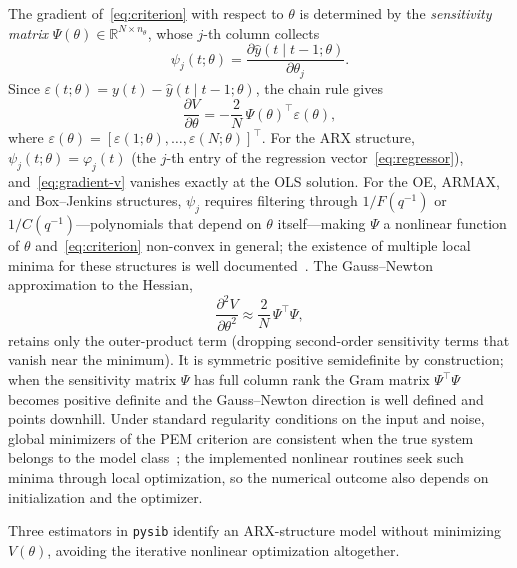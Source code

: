 \documentclass{ifacconf}
\begin{document}
The gradient of~\eqref{eq:criterion} with respect to $\theta$ is
determined by the \emph{sensitivity matrix}
$\Psi(\theta) \in \mathbb{R}^{N \times n_\theta}$, whose $j$-th column collects
\begin{equation}
  \psi_j(t;\theta) = \frac{\partial\hat{y}(t \mid t-1;\theta)}{\partial\theta_j}.
  \label{eq:sensitivity}
\end{equation}
Since $\varepsilon(t;\theta) = y(t) - \hat{y}(t \mid t-1;\theta)$, the chain rule gives
\begin{equation}
  \frac{\partial V}{\partial\theta} = -\frac{2}{N}\,\Psi(\theta)^\top\varepsilon(\theta),
  \label{eq:gradient-v}
\end{equation}
where $\varepsilon(\theta) = [\varepsilon(1;\theta),\ldots,\varepsilon(N;\theta)]^\top$.
For the ARX structure, $\psi_j(t;\theta) = \varphi_j(t)$ (the $j$-th entry of
the regression vector~\eqref{eq:regressor}), and~\eqref{eq:gradient-v} vanishes
exactly at the OLS solution.  For the OE, ARMAX, and Box--Jenkins structures, $\psi_j$
requires filtering through $1/F(q^{-1})$ or $1/C(q^{-1})$---polynomials
that depend on $\theta$ itself---making $\Psi$ a nonlinear function of
$\theta$ and~\eqref{eq:criterion} non-convex in general; the existence
of multiple local minima for these structures is well
documented~\cite{eckhard2011global,eckhard2012pem}.  The
Gauss--Newton approximation to the Hessian,
\begin{equation}
  \frac{\partial^2 V}{\partial\theta^2} \approx \frac{2}{N}\,\Psi^\top\Psi,
  \label{eq:gn-hessian-fw}
\end{equation}
retains only the outer-product term (dropping second-order sensitivity
terms that vanish near the minimum).  It is symmetric positive semidefinite
by construction; when the sensitivity matrix $\Psi$ has full column rank
the Gram matrix $\Psi^\top\Psi$ becomes positive definite and the
Gauss--Newton direction is well defined and points downhill.
Under standard regularity conditions on the input and noise,
global minimizers of the PEM criterion are consistent when the
true system belongs to the model class~\cite{ljung1999};
the implemented nonlinear routines seek such minima through local
optimization, so the numerical outcome also depends on
initialization and the optimizer.

Three estimators in \texttt{pysib} identify an ARX-structure model without
minimizing $V(\theta)$, avoiding the iterative nonlinear optimization
altogether.
\end{document}
